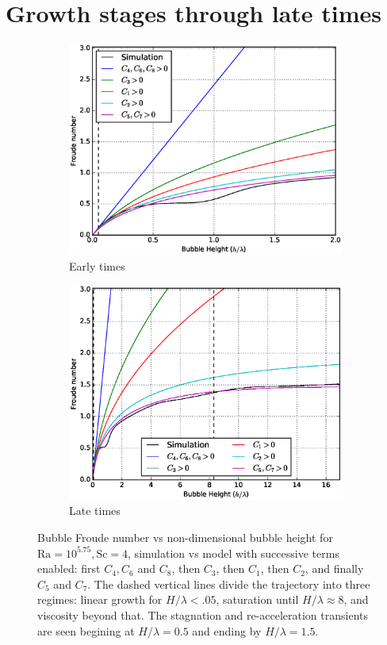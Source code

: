 \section{Growth stages through late times} 

\begin{figure}
\begin{subfigure}[b]{\columnwidth}
\includegraphics[width=\columnwidth]{figs/Cascade-short-4-1}
\caption{Early times}
\end{subfigure}
\begin{subfigure}[b]{\columnwidth}
\includegraphics[width=\columnwidth]{figs/Cascade-4-1}
\caption{Late times}
\end{subfigure}
\caption{ 
Bubble Froude number vs non-dimensional bubble height for $\text{Ra} = 10^{5.75}, \text{Sc} = 4$, simulation vs model with successive terms enabled: first $C_4, C_6$ and $C_8$, then $C_3$, then $C_1$, then $C_2$, and finally $C_5$ and $C_7$.
The dashed vertical lines divide the trajectory into three regimes: linear growth for $H/\lambda < .05$, saturation until $H / \lambda \approx 8$, and viscosity beyond that.
The stagnation and re-acceleration transients are seen begining at $H/\lambda = 0.5$ and ending by $H / \lambda = 1.5$.
}
\end{figure}

